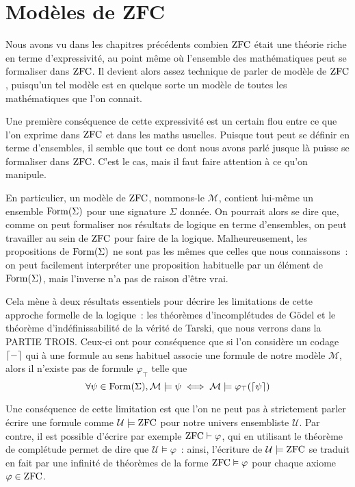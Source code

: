 \chapter{Modèles de ZFC}
\label{chp.modZFC}

\minitoc

Nous avons vu dans les chapitres précédents combien $\operatorname{ZFC}$ était une théorie
riche en terme d'expressivité, au point même où l'ensemble des mathématiques
peut se formaliser dans $\operatorname{ZFC}$. Il devient alors assez technique de parler de
modèle de $\operatorname{ZFC}$, puisqu'un tel modèle est en quelque sorte un modèle de toutes
les mathématiques que l'on connait.

Une première conséquence de cette expressivité est un certain flou entre ce que
l'on exprime dans $\operatorname{ZFC}$ et dans les maths usuelles. Puisque tout peut se
définir en terme d'ensembles, il semble que tout ce dont nous avons parlé jusque
là puisse se formaliser dans $\operatorname{ZFC}$. C'est le cas, mais il faut faire attention
à ce qu'on manipule.

En particulier, un modèle de $\operatorname{ZFC}$, nommons-le $\mathcal M$, contient lui-même
un ensemble $\operatorname{Form}(\Sigma)$ pour une signature $\Sigma$ donnée. On pourrait
alors se dire que, comme on peut formaliser nos résultats de logique en terme
d'ensembles, on peut travailler au sein de $\operatorname{ZFC}$ pour faire de la logique.
Malheureusement, les propositions de $\operatorname{Form}(\Sigma)$ ne sont pas les mêmes
que celles que nous connaissons~: on peut facilement interpréter une proposition
habituelle par un élément de $\operatorname{Form}(\Sigma)$, mais l'inverse n'a pas de
raison d'être vrai.

Cela mène à deux résultats essentiels pour décrire les limitations de cette
approche formelle de la logique~: les théorèmes d'incomplétudes de Gödel et le
théorème d'indéfinissabilité de la vérité de Tarski, que nous verrons dans la
PARTIE TROIS. Ceux-ci ont pour conséquence que si l'on considère un codage
$\lceil-\rceil$ qui à une formule au sens habituel associe une formule de notre
modèle $\mathcal M$, alors il n'existe pas de formule $\varphi_\top$ telle que
\[\forall \psi \in \operatorname{Form}(\Sigma), \mathcal M \models \psi
\iff \mathcal M\models \varphi_\top(\lceil\psi\rceil)\]

Une conséquence de cette limitation est que l'on ne peut pas à strictement
parler écrire une formule comme $\mathcal U\models \operatorname{ZFC}$ pour notre univers
ensembliste $\mathcal U$. Par contre, il est possible d'écrire par exemple
$\operatorname{ZFC}\vdash \varphi$, qui en utilisant le théorème de complétude permet de dire
que $\mathcal U \models \varphi$~: ainsi, l'écriture de $\mathcal U\models\operatorname{ZFC}$
se traduit en fait par une infinité de théorèmes de la forme
$\operatorname{ZFC}\vDash \varphi$ pour chaque axiome $\varphi \in \operatorname{ZFC}$.

